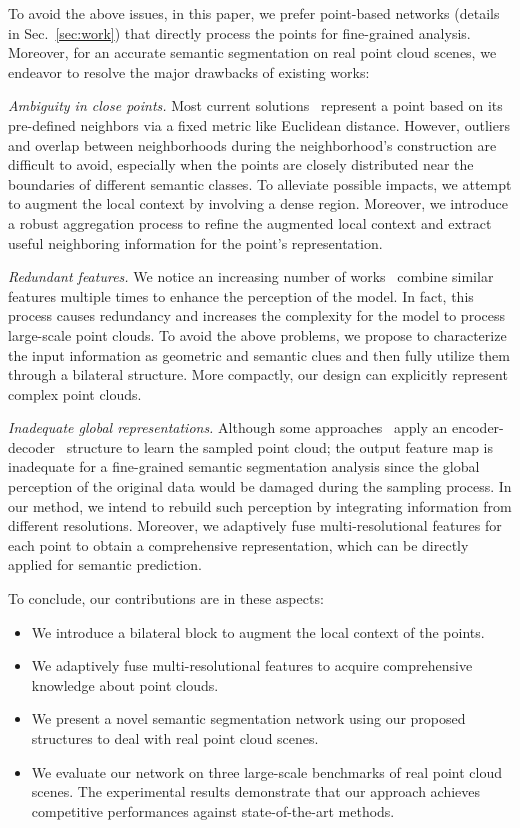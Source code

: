 \documentclass[10pt,twocolumn,letterpaper]{article}
\begin{document}
To avoid the above issues, in this paper, we prefer point-based networks (details in Sec.~\ref{sec:work}) that directly process the points for fine-grained analysis. Moreover, for an accurate semantic segmentation on real point cloud scenes, we endeavor to resolve the major drawbacks of existing works: 

\emph{Ambiguity in close points.} Most current solutions~\cite{wang2019dynamic, engelmann2020dilated, qiu2021dense} represent a point based on its pre-defined neighbors via a fixed metric like Euclidean distance. However, outliers and overlap between neighborhoods during the neighborhood's construction are difficult to avoid, especially when the points are closely distributed near the boundaries of different semantic classes. To alleviate possible impacts, we attempt to augment the local context by involving a dense region. Moreover, we introduce a robust aggregation process to refine the augmented local context and extract useful neighboring information for the point's representation.

\emph{Redundant features.} We notice an increasing number of works~\cite{hu2020randla, yan2020pointasnl, qiu2019geometric} combine similar features multiple times to enhance the perception of the model. In fact, this process causes redundancy and increases the complexity for the model to process large-scale point clouds. To avoid the above problems, we propose to characterize the input information as geometric and semantic clues and then fully utilize them through a bilateral structure. More compactly, our design can explicitly represent complex point clouds.

\emph{Inadequate global representations.} Although some approaches~\cite{qi2017pointnet++, liu2019relation, li2019pu} apply an encoder-decoder~\cite{badrinarayanan2017segnet} structure to learn the sampled point cloud; the output feature map is inadequate for a fine-grained semantic segmentation analysis since the global perception of the original data would be damaged during the sampling process. In our method, we intend to rebuild such perception by integrating information from different resolutions. Moreover, we adaptively fuse multi-resolutional features for each point to obtain a comprehensive representation, which can be directly applied for semantic prediction.  

To conclude, our contributions are in these aspects:
\begin{itemize}
\item We introduce a bilateral block to augment the local context of the points.
\item We adaptively fuse multi-resolutional features to acquire comprehensive knowledge about point clouds.
\item We present a novel semantic segmentation network using our proposed structures to deal with real point cloud scenes.
\item We evaluate our network on three large-scale benchmarks of real point cloud scenes. The experimental results demonstrate that our approach achieves competitive performances against state-of-the-art methods.
\end{itemize}
\end{document}
